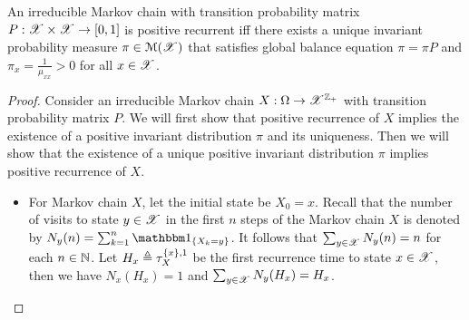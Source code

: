 \documentclass[letterpaper,10pt,english]{article}
\begin{document}
\begin{thm} 
An irreducible Markov chain with transition probability matrix $P:\mathscr{X}\times\mathscr{X}\to[0,1]$ is positive recurrent iff there exists a unique invariant probability measure $\pi \in \mathcal{M}(\mathscr{X})$ that satisfies global balance equation $\pi = \pi P$ and $\pi_x = \frac{1}{\mu_{xx}} > 0$ for all $x \in \mathscr{X}$. 
\end{thm}
\begin{proof} 
Consider an irreducible Markov chain $X:\Omega\to\mathscr{X}^{\mathbb{Z}_+}$ with transition probability matrix $P$.  
We will first show that positive recurrence of $X$ implies the existence of a positive invariant distribution $\pi$ and its uniqueness. 
Then we will show that the existence of a unique positive invariant distribution $\pi$ implies positive recurrence of $X$.  
\begin{itemize}
\item[Implication:]
For Markov chain $X$, let the initial state be $X_0 = x$. 
Recall that the number of visits to state $y \in \mathscr{X}$ in the first $n$ steps of the Markov chain $X$ is denoted by $N_y(n) = \sum_{k=1}^n\SetIn{X_k = y}$.  
It follows that $\sum_{y \in \mathscr{X}}N_y(n) = n$ for each $n \in \mathbb{N}$. 
Let $H_x \triangleq \tau_X^{\left\{x\right\},1}$ be the first recurrence time to state $x\in\mathscr{X}$, then we have $N_x(H_x) = 1$ and $\sum_{y \in \mathscr{X}}N_y(H_x) = H_x$. 


\end{itemize}
\end{proof}
\end{document}
